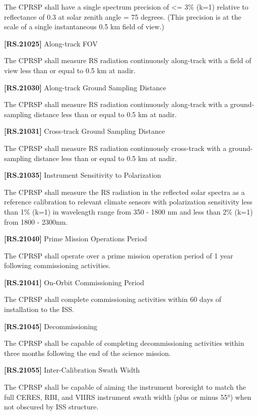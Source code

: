 The \gls{CPRSP} shall have a single spectrum precision of <= 3\% (k=1) relative to reflectance of 0.3 at solar zenith angle = 75 degrees. (This precision is at the scale of a single instantaneous 0.5 km field of view.)

\textbf{[RS.21025]} Along-track \gls{FOV}

The \gls{CPRSP} shall \gls{measure} \gls{RS} radiation continuously along-track with a field of view less than or equal to 0.5 km at nadir.

\textbf{[RS.21030]} Along-track Ground Sampling Distance

The \gls{CPRSP} shall \gls{measure} \gls{RS} radiation continuously along-track with a ground-sampling distance less than or equal to 0.5 km at nadir.

\textbf{[RS.21031]} Cross-track Ground Sampling Distance

The \gls{CPRSP} shall \gls{measure} \gls{RS} radiation continuously cross-track with a ground-sampling distance less than or equal to 0.5 km at nadir.

\textbf{[RS.21035]} Instrument Sensitivity to Polarization

The \gls{CPRSP} shall \gls{measure} the \gls{RS} radiation in the reflected solar spectra as a reference calibration to relevant climate sensors with polarization sensitivity less than 1\% (k=1) in wavelength range from 350 - 1800 nm and less than 2\% (k=1) from 1800 - 2300nm.

\textbf{[RS.21040]} Prime Mission Operations Period

The \gls{CPRSP} shall operate over a prime mission operation period of 1 year following commissioning activities.

\textbf{[RS.21041]} On-Orbit Commissioning Period

The \gls{CPRSP} shall complete commissioning activities within 60 days of installation to the \gls{ISS}.

\textbf{[RS.21045]} Decommissioning

The \gls{CPRSP} shall be capable of completing decommissioning activities within three months following the end of the science mission.

\textbf{[RS.21055]} Inter-Calibration Swath Width

The \gls{CPRSP} shall be capable of aiming the instrument boresight to match the full \gls{CERES}, \gls{RBI}, and \gls{VIIRS} instrument swath width (plus or minus 55°) when not obscured by \gls{ISS} structure.

